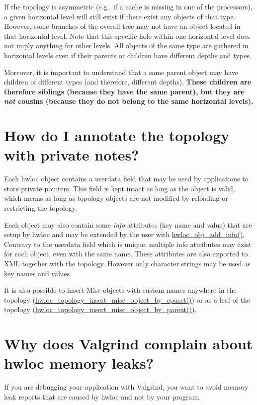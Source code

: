 If the topology is asymmetric (e.g., if a cache is missing in one of the processors), a given horizontal level will still exist if there exist any objects of that type. However, some branches of the overall tree may not have an object located in that horizontal level. Note that this specific hole within one horizontal level does not imply anything for other levels. All objects of the same type are gathered in horizontal levels even if their parents or children have different depths and types.

Moreover, it is important to understand that a same parent object may have children of different types (and therefore, different depths). {\bfseries These children are therefore siblings (because they have the same parent), but they are {\itshape not\/} cousins (because they do not belong to the same horizontal levels).}\hypertarget{a00011_faq_annotate}{}\section{How do I annotate the topology with private notes?}\label{a00011_faq_annotate}
Each hwloc object contains a {\ttfamily userdata} field that may be used by applications to store private pointers. This field is kept intact as long as the object is valid, which means as long as topology objects are not modified by reloading or restricting the topology.

Each object may also contain some {\itshape info\/} attributes (key name and value) that are setup by hwloc and may be extended by the user with {\ttfamily \hyperlink{a00048_gaba3afe636940872772ed6dfaf0b3552e}{hwloc\_\-obj\_\-add\_\-info()}}. Contrary to the {\ttfamily userdata} field which is unique, multiple info attributes may exist for each object, even with the same name. These attributes are also exported to XML together with the topology. However only character strings may be used as key names and values.

It is also possible to insert Misc objects with custom names anywhere in the topology ({\ttfamily \hyperlink{a00045_ga017a9ba16d554326c6e3812d545d7230}{hwloc\_\-topology\_\-insert\_\-misc\_\-object\_\-by\_\-cpuset()}}) or as a leaf of the topology ({\ttfamily \hyperlink{a00045_gadacd7a3d21220fbb30c3256d8b22a294}{hwloc\_\-topology\_\-insert\_\-misc\_\-object\_\-by\_\-parent()}}).\hypertarget{a00011_faq_valgrind}{}\section{Why does Valgrind complain about hwloc memory leaks?}\label{a00011_faq_valgrind}
If you are debugging your application with Valgrind, you want to avoid memory leak reports that are caused by hwloc and not by your program.

